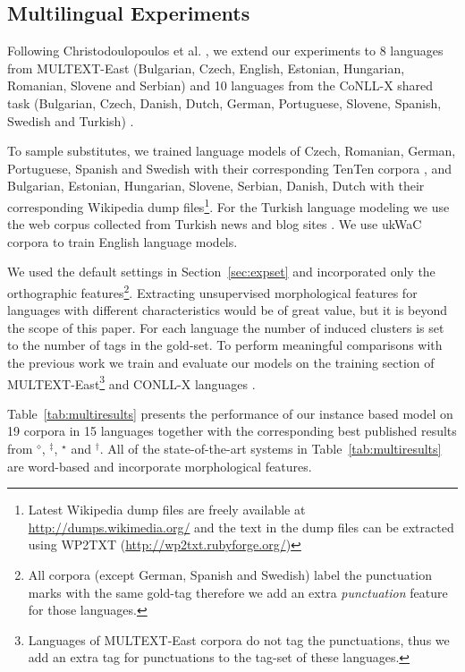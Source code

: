 \subsection{Multilingual Experiments}
\label{sec:multilang}
\noindent Following Christodoulopoulos et
al. , we extend our
experiments to 8 languages from MULTEXT-East (Bulgarian, Czech, English,
Estonian, Hungarian, Romanian, Slovene and Serbian) \cite{citeulike:5820223}
and 10 languages from the CoNLL-X shared task (Bulgarian, Czech, Danish, Dutch,
German, Portuguese, Slovene, Spanish, Swedish and Turkish)
\cite{Buchholz:2006:CST:1596276.1596305}.  

To sample substitutes, we trained language models of Czech, Romanian, German,
Portuguese, Spanish and Swedish with their corresponding TenTen corpora
\cite{jakubivcek2013tenten}, and Bulgarian, Estonian, Hungarian, Slovene,
Serbian, Danish, Dutch with their corresponding Wikipedia dump
files\footnote{Latest Wikipedia dump files are freely available at
  \url{http://dumps.wikimedia.org/} and the text in the dump files can be
  extracted using WP2TXT (\url{http://wp2txt.rubyforge.org/})}.  For the
  Turkish language modeling we use the web corpus collected from Turkish news
  and blog sites \cite{sak2008turkish}.  We use ukWaC corpora to train English
  language models.

We used the default settings in Section~\ref{sec:expset} and incorporated only
the orthographic features\footnote{All corpora (except German, Spanish and
Swedish) label the punctuation marks with the same gold-tag therefore we add an
extra {\em punctuation} feature for those languages.}.  Extracting
unsupervised morphological features for languages with different
characteristics would be of great value, but it is beyond the scope of this
paper.  For each language the number of induced clusters is set to the number
of tags in the gold-set.  To perform meaningful comparisons with the previous
work we train and evaluate our models on the training section of
MULTEXT-East\footnote{Languages of MULTEXT-East corpora do not tag the
punctuations, thus we add an extra tag for punctuations to the tag-set of these
languages.} and CONLL-X languages \cite{Lee:2010:STU:1870658.1870741}.

Table~\ref{tab:multiresults} presents the performance of our instance based
model on 19 corpora in 15 languages together with the corresponding best
published results from
$^\diamond$\protect\cite{yatbaz-sert-yuret:2012:EMNLP-CoNLL},
$^\ddagger$\protect\cite{blunsom-cohn:2011:ACL-HLT2011},
$^\star$\protect\cite{christodoulopoulos-goldwater-steedman:2011:EMNLP} and
$^\dagger$\protect\cite{Clark:2003:CDM:1067807.1067817}.  All of the
state-of-the-art systems in Table~\ref{tab:multiresults} are word-based and
incorporate morphological features. 


